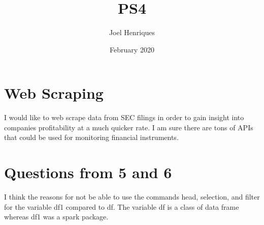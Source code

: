 \documentclass{article}
\title{PS4}
\author{Joel Henriques}
\date{February 2020}
\begin{document}
\maketitle

\section{Web Scraping}
I would like to web scrape data from SEC filings in order to gain insight into companies profitability at a much quicker rate. I am sure there are tons of APIs that could be used for monitoring financial instruments. 


\section{Questions from 5 and 6}
I think the reasons for not be able to use the commands head, selection, and filter for the variable df1 compared to df. The variable df is a class of data frame whereas df1 was a spark package. 
\end{document}
